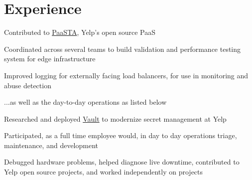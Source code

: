 \documentclass[letterpaper]{deedy-resume} %
\begin{document}
\begin{minipage}[t]{0.66\textwidth} %


\section{Experience}


\vspace{\topsep} %

\begin{tightitemize}
\item Contributed to \href{https://github.com/yelp/paasta}{PaaSTA}, Yelp's open source PaaS
\item Coordinated across several teams to build validation and performance
  testing system for edge infrastructure
\item Improved logging for externally facing load balancers, for use in monitoring
  and abuse detection
\item ...as well as the day-to-day operations as listed below
\end{tightitemize}

\sectionspace %




\begin{tightitemize}
\item Researched and deployed \href{https://vaultproject.io}{Vault} to modernize secret management at Yelp
\item Participated, as a full time employee would, in day to day operations
  triage, maintenance, and development
\item Debugged hardware problems, helped diagnose live downtime,
  contributed to Yelp open source projects, and worked independently on projects
\end{tightitemize}

\sectionspace %


\end{minipage}
\end{document}

